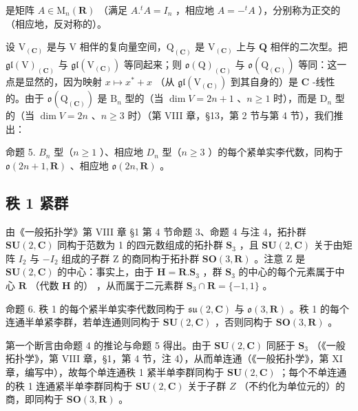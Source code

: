 是矩阵 \(A \in \mathrm{M}_n(\mathbf{R})\) （满足 \(A.^t A = I_n\) ，相应地 \(A = -^t A\) ），分别称为正交的（相应地，反对称的）。

设 \(\mathrm{V}_{(\mathbf{C})}\) 是与 \(\mathrm{V}\) 相伴的复向量空间，\(\mathrm{Q}_{(\mathbf{C})}\) 是 \(\mathrm{V}_{(\mathbf{C})}\) 上与 \(\mathbf{Q}\) 相伴的二次型。把 \(\mathfrak{gl}(\mathrm{V})_{(\mathbf{C})}\) 与 \(\mathfrak{gl}(\mathrm{V}_{(\mathbf{C})})\) 等同起来；则 \(\mathfrak{o}(\mathrm{Q})_{(\mathbf{C})}\) 与 \(\mathfrak{o}(\mathrm{Q}_{(\mathbf{C})})\) 等同：这一点是显然的，因为映射 \(x \mapsto x^{*} + x\) （从 \(\mathfrak{gl}(\mathrm{V}_{(\mathbf{C})})\) 到其自身的）是 \(\mathbf{C}\) -线性的。由于 \(\mathfrak{o}(\mathrm{Q}_{(\mathbf{C})})\) 是 \(\mathrm{B}_n\) 型的（当 \(\dim V = 2n + 1\) 、\(n \geq 1\) 时），而是 \(\mathrm{D}_n\) 型的（当 \(\dim V = 2n\) 、\(n \geq 3\) 时）（第 VIII 章，§13，第 2 节与第 4 节），我们推出：

命题 5. \(B_{n}\) 型（\(n \geq 1\) ）、相应地 \(D_{n}\) 型（\(n \geq 3\) ）的每个紧单实李代数，同构于 \(\mathfrak{o}(2n + 1, \mathbf{R})\) 、相应地 \(\mathfrak{o}(2n, \mathbf{R})\) 。

\subsection{秩 1 紧群}

由《一般拓扑学》第 VIII 章 §1 第 4 节命题 3、命题 4 与注 4，拓扑群 \(\mathbf{SU}(2,\mathbf{C})\) 同构于范数为 1 的四元数组成的拓扑群 \(\mathbf{S}_3\) ，且 \(\mathbf{SU}(2,\mathbf{C})\) 关于由矩阵 \(I_2\) 与 \(-I_2\) 组成的子群 Z 的商同构于拓扑群 \(\mathbf{SO}(3,\mathbf{R})\) 。注意 Z 是 \(\mathbf{SU}(2,\mathbf{C})\) 的中心：事实上，由于 \(\mathbf{H} = \mathbf{R}.\mathbf{S}_3\) ，群 \(\mathbf{S}_3\) 的中心的每个元素属于中心 \(\mathbf{R}\) （代数 \(\mathbf{H}\) 的） ，从而属于二元素群 \(\mathbf{S}_3 \cap \mathbf{R} = \{-1,1\}\) 。

命题 6. 秩 1 的每个紧半单实李代数同构于 \(\mathfrak{su}(2,\mathbf{C})\) 与 \(\mathfrak{o}(3,\mathbf{R})\) 。秩 1 的每个连通半单紧李群，若单连通则同构于 \(\mathbf{SU}(2,\mathbf{C})\) ，否则同构于 \(\mathbf{SO}(3,\mathbf{R})\) 。

第一个断言由命题 4 的推论与命题 5 得出。由于 \(\mathbf{SU}(2,\mathbf{C})\) 同胚于 \(\mathbf{S}_3\) （《一般拓扑学》，第 VIII 章，§1，第 4 节，注 4），从而单连通（《一般拓扑学》，第 XI 章，编写中），故每个单连通秩 1 紧半单李群同构于 \(\mathbf{SU}(2,\mathbf{C})\) ；每个不单连通的秩 1 连通紧半单李群同构于 \(\mathbf{SU}(2,\mathbf{C})\) 关于子群 \(Z\) （不约化为单位元的）的商，即同构于 \(\mathbf{SO}(3,\mathbf{R})\) 。


